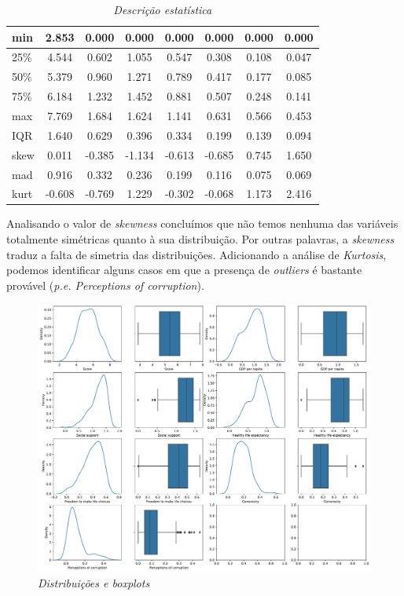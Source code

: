 \documentclass[12pt, a4paper]{article}
\begin{document}
\begin{table}[ht]
\begin{tabular}{|l|c|c|c|c|c|c|c|}
min & 2.853 & 0.000 & 0.000 & 0.000 & 0.000 & 0.000 & 0.000 \\ \hline
25\% & 4.544 & 0.602 & 1.055 & 0.547 & 0.308 & 0.108 & 0.047 \\ \hline
50\% & 5.379 & 0.960 & 1.271 & 0.789 & 0.417 & 0.177 & 0.085 \\ \hline
75\% & 6.184 & 1.232 & 1.452 & 0.881 & 0.507 & 0.248 & 0.141 \\ \hline
max & 7.769 & 1.684 & 1.624 & 1.141 & 0.631 & 0.566 & 0.453 \\ \hline
IQR & 1.640 & 0.629 & 0.396 & 0.334 & 0.199 & 0.139 & 0.094 \\ \hline
skew & 0.011 & -0.385 & -1.134 & -0.613 & -0.685 & 0.745 & 1.650 \\ \hline
mad & 0.916 & 0.332 & 0.236 & 0.199 & 0.116 & 0.075 & 0.069 \\ \hline
kurt & -0.608 & -0.769 & 1.229 & -0.302 & -0.068 & 1.173 & 2.416 \\ \hline
\end{tabular}
\caption{\emph{Descrição estatística}}
\label{tab:tab1}
\end{table}

Analisando o valor de \emph{skewness} concluímos que não temos nenhuma
das variáveis totalmente simétricas quanto à sua distribuição. Por
outras palavras, a \emph{skewness} traduz a falta de simetria das
distribuições. Adicionando a análise de \emph{Kurtosis}, podemos
identificar alguns casos em que a presença de \emph{outliers} é bastante
provável (\emph{p.e. Perceptions of corruption}).

\begin{figure}[ht!]
\includegraphics[scale=0.43]{boxplots3.pdf}
\centering
\caption{\emph{Distribuições e boxplots}}
\label{fig:fig4}
\end{figure}
\end{document}

